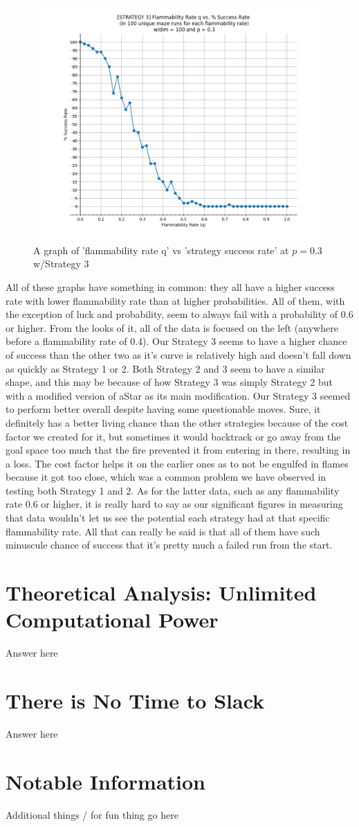 \documentclass[11pt]{article}
\begin{document}
\begin{figure}[!]
\centering
\includegraphics[scale=0.50]{Strategy3_q_successRate.PNG}
\caption{A graph of 'flammability rate q' vs 'strategy success rate' at $p = 0.3$ w/Strategy 3}
\end{figure}

All of these graphs have something in common: they all have a higher success rate with lower flammability rate than at higher probabilities. All of them, with the exception of luck and probability, seem to always fail with a probability of 0.6 or higher. From the looks of it, all of the data is focused on the left (anywhere before a flammability rate of 0.4). Our Strategy 3 seems to have a higher chance of success than the other two as it's curve is relatively high and doesn't fall down as quickly as Strategy 1 or 2. Both Strategy 2 and 3 seem to have a similar shape, and this may be because of how Strategy 3 was simply Strategy 2 but with a modified version of aStar as its main modification. Our Strategy 3 seemed to perform better overall despite having some questionable moves. Sure, it definitely has a better living chance than the other strategies because of the cost factor we created for it, but sometimes it would backtrack or go away from the goal space too much that the fire prevented it from entering in there, resulting in a loss. The cost factor helps it on the earlier ones as to not be engulfed in flames because it got too close, which was a common problem we have observed in testing both Strategy 1 and 2. As for the latter data, such as any flammability rate 0.6 or higher, it is really hard to say as our significant figures in measuring that data wouldn't let us see the potential each strategy had at that specific flammability rate. All that can really be said is that all of them have such minuscule chance of success that it's pretty much a failed run from the start. 
\pagebreak
\section{Theoretical Analysis: Unlimited Computational Power}
Answer here
	\pagebreak
\section{There is No Time to Slack}
Answer here
	\pagebreak
\section{Notable Information}
Additional things / for fun thing go here
\end{document}
